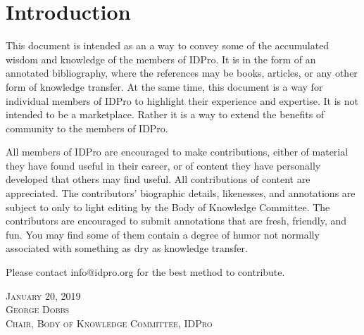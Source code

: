 \section{Introduction}
This document is intended as an a way to convey some of the accumulated wisdom and knowledge of the members of IDPro.
It is in the form of an annotated bibliography, where the references may be books, articles, or any other form of knowledge transfer.  At the same time, this document is a way for individual members of IDPro to highlight their experience and expertise.  It is not intended to be a marketplace.  Rather it is a way to extend the benefits of community to the members of IDPro.


All members of IDPro are encouraged to make contributions, either of material they have found useful in their career, or of content they have personally developed that others may find useful.  All contributions of content are appreciated. The contributors' biographic details, likenesses, and annotations are subject to only to light editing by the Body of Knowledge Committee.  The contributors are encouraged to submit annotations that are fresh, friendly, and fun. You may find some of them contain a degree of humor not normally associated with something as dry as knowledge transfer.

Please contact info@idpro.org for the best method to contribute.

\vspace{24pt}
{\setlength{\parindent}{0cm}
\textsc{
January 20, 2019\\
George Dobbs\\
Chair, Body of Knowledge Committee, IDPro}
}
